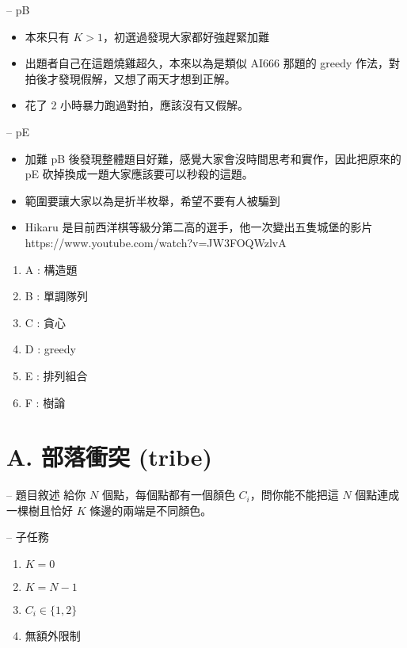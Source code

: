 \documentclass[hyperref,UTF8,notheorems,xcolor={dvipsnames}]{beamer}
\newcommand{\btitle}[1]{{\secname} -- #1}
\theoremstyle{definition}
\begin{document}
\begin{frame}[fragile]{\btitle{pB}}
	\begin{itemize}
		\item 本來只有 $K > 1$，初選過發現大家都好強趕緊加難
		\pause
		\item 出題者自己在這題燒雞超久，本來以為是類似 AI666 那題的 greedy 作法，對拍後才發現假解，又想了兩天才想到正解。
		\pause
		\item 花了 2 小時暴力跑過對拍，應該沒有又假解。
	\end{itemize}
\end{frame}

\begin{frame}[fragile]{\btitle{pE}}
	\begin{itemize}
		\item 加難 pB 後發現整體題目好難，感覺大家會沒時間思考和實作，因此把原來的 pE 砍掉換成一題大家應該要可以秒殺的這題。
		\pause
		\item 範圍要讓大家以為是折半枚舉，希望不要有人被騙到
		\pause
		\item Hikaru 是目前西洋棋等級分第二高的選手，他一次變出五隻城堡的影片 https://www.youtube.com/watch?v=JW3FOQWzlvA
	\end{itemize}
\end{frame}


\begin{frame}[fragile]{\secname}
	\begin{enumerate}
		\item A : 構造題
		\item B : 單調隊列
		\item C : 貪心
		\item D : greedy
		\item E : 排列組合
		\item F : 樹論
	\end{enumerate}
\end{frame}

\section{A. 部落衝突 (tribe)}


\begin{frame}[fragile]{\btitle{題目敘述}}
	給你 $N$ 個點，每個點都有一個顏色 $C_i$，問你能不能把這 $N$ 個點連成一棵樹且恰好 $K$ 條邊的兩端是不同顏色。
\end{frame}

\begin{frame}[fragile]{\btitle{子任務}}
	\begin{enumerate}
		\item $K = 0$
		\item $K = N - 1$
		\item $C_i \in \{1, 2\}$
		\item 無額外限制
	\end{enumerate}
\end{frame}
\end{document}
